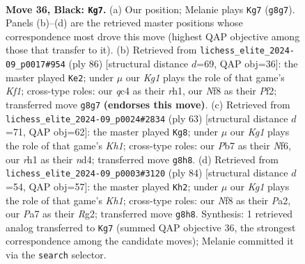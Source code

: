 \documentclass[11pt]{article}
\begin{document}
\clearpage

\begin{figure}[p]\centering
\begin{subfigure}{0.46\textwidth}\centering
\resizebox{\linewidth}{!}{%
\newchessgame
\chessboard[
  setfen={5nk1/pp5p/7p/1P6/2QP4/1r3q2/4N3/R5KR b - - 8 36},
  showmover=false,
  pgfstyle=straightmove, color=movearrow, markmove={g8-g7}
]}
\caption{}
\end{subfigure}\hfill
\begin{subfigure}{0.46\textwidth}\centering
\resizebox{\linewidth}{!}{%
\newchessgame
\chessboard[
  setfen={1Rr5/P4pk1/8/3Pq2p/1Qp1p3/2N1P3/5P2/5K1r w - - 2 44},
  showmover=false,
  pgfstyle=straightmove, color=movearrow, markmove={f1-e2}
]}
\caption{}
\end{subfigure}
\\[4pt]
\begin{subfigure}{0.46\textwidth}\centering
\resizebox{\linewidth}{!}{%
\newchessgame
\chessboard[
  setfen={3r3k/8/p2q1n2/1p6/3N4/PP5Q/1P5p/1K5R b - - 0 32},
  showmover=false,
  pgfstyle=straightmove, color=movearrow, markmove={h8-g8}
]}
\caption{}
\end{subfigure}\hfill
\begin{subfigure}{0.46\textwidth}\centering
\resizebox{\linewidth}{!}{%
\newchessgame
\chessboard[
  setfen={1k4r1/pp3N2/2n1Q3/3pPp2/8/7P/PP4R1/2q4K w - - 0 43},
  showmover=false,
  pgfstyle=straightmove, color=movearrow, markmove={h1-h2}
]}
\caption{}
\end{subfigure}
\caption{\textbf{Move 36, Black: \texttt{Kg7}.} (a) Our position; Melanie plays \texttt{Kg7} (\texttt{g8g7}). Panels (b)--(d) are the retrieved master positions whose correspondence most drove this move (highest QAP objective among those that transfer to it). (b) Retrieved from \texttt{lichess\_elite\_2024-09\_p0017\#954} (ply 86) [structural distance $d$=69, QAP obj=36]: the master played \texttt{Ke2}; under $\mu$ our \emph{Kg1} plays the role of that game's \emph{Kf1}; cross-type roles: our \emph{q}c4 as their \emph{r}h1, our \emph{N}f8 as their \emph{P}f2; transferred move \texttt{g8g7} \textbf{(endorses this move)}. (c) Retrieved from \texttt{lichess\_elite\_2024-09\_p0024\#2834} (ply 63) [structural distance $d$=71, QAP obj=62]: the master played \texttt{Kg8}; under $\mu$ our \emph{Kg1} plays the role of that game's \emph{Kh1}; cross-type roles: our \emph{P}b7 as their \emph{N}f6, our \emph{r}h1 as their \emph{n}d4; transferred move \texttt{g8h8}. (d) Retrieved from \texttt{lichess\_elite\_2024-09\_p0003\#3120} (ply 84) [structural distance $d$=54, QAP obj=57]: the master played \texttt{Kh2}; under $\mu$ our \emph{Kg1} plays the role of that game's \emph{Kh1}; cross-type roles: our \emph{N}f8 as their \emph{P}a2, our \emph{P}a7 as their \emph{R}g2; transferred move \texttt{g8h8}. Synthesis: 1 retrieved analog transferred to \texttt{Kg7} (summed QAP objective 36, the strongest correspondence among the candidate moves); Melanie committed it via the \texttt{search} selector.}
\label{fig:thought-m71}
\end{figure}
\end{document}
